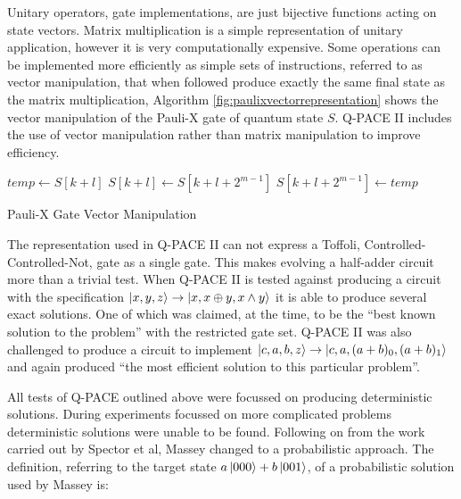 Unitary operators, gate implementations, are just bijective functions acting on state vectors.
Matrix multiplication is a simple representation of unitary application, however it is very computationally expensive.
Some operations can be implemented more efficiently as simple sets of instructions, referred to as vector manipulation, that when followed produce exactly the same final state as the matrix multiplication, Algorithm \ref{fig:paulixvectorrepresentation} shows the vector manipulation of the Pauli-X gate of quantum state $S$.
Q-PACE II includes the use of vector manipulation rather than matrix manipulation to improve efficiency.
\begin{algorithm}
\begin{algorithmic}
\STATE $temp \gets S[k+l]$
\STATE $S[k+l] \gets S[k+l+2^{m-1}]$
\STATE $S[k+l+2^{m-1}] \gets temp$
\ENDFOR
\ENDFOR
\end{algorithmic}
\caption{Pauli-X Gate Vector Manipulation}
\label{fig:paulixvectorrepresentation}
\end{algorithm}

The representation used in Q-PACE II can not express a Toffoli, Controlled-Controlled-Not, gate as a single gate.
This makes evolving a half-adder circuit more than a trivial test.
When Q-PACE II is tested against producing a circuit with the specification $\left\vert{x, y, z}\right\rangle\rightarrow\left\vert{x,x \oplus y, x \wedge y}\right\rangle$ it is able to produce several exact solutions.
One of which was claimed, at the time, to be the ``best known solution to the problem''\cite{masseythesis} with the restricted gate set.
Q-PACE II was also challenged to produce a circuit to implement $\left\vert{c, a, b, z}\right\rangle\rightarrow\left\vert{c, a, (a+b)_0, (a+b)_1}\right\rangle$ and again produced ``the most efficient solution to this particular problem''\cite{masseythesis}.


All tests of Q-PACE outlined above were focussed on producing deterministic solutions.
During experiments focussed on more complicated problems deterministic solutions were unable to be found.
Following on from the work carried out by Spector et al\cite{LSpectorGPforQC,LSpectorANDOR,Spector:1999:QCA:316573.317112}, Massey changed to a probabilistic approach.
The definition, referring to the target state $a\left\vert{000}\right\rangle+b\left\vert{001}\right\rangle$, of a probabilistic solution used by Massey is:

